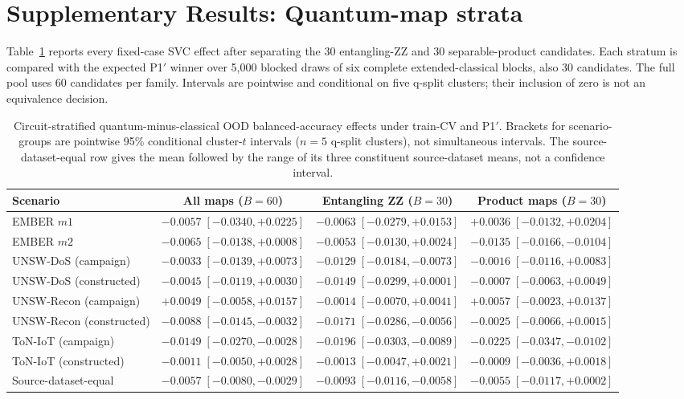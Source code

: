 \documentclass[11pt]{article}
\begin{document}
\clearpage
\section*{Supplementary Results: Quantum-map strata}
\label{supp:quantum_strata}

Table~\ref{supp:tab_quantum_strata} reports every fixed-case SVC effect after
separating the 30 entangling-ZZ and 30 separable-product candidates. Each
stratum is compared with the expected P1$'$ winner over 5,000 blocked draws
of six complete extended-classical blocks, also 30 candidates. The full pool
uses 60 candidates per family. Intervals are pointwise and conditional on five
q-split clusters; their inclusion of zero is not an equivalence decision.

\begin{table}[ht]
\centering
\caption{Circuit-stratified quantum-minus-classical OOD balanced-accuracy
effects under train-CV and P1$'$. Brackets for scenario-groups are pointwise
95\% conditional cluster-$t$ intervals ($n=5$ q-split clusters), not
simultaneous intervals. The source-dataset-equal row gives the mean followed
by the range of its three constituent source-dataset means, not a confidence
interval.}
\label{supp:tab_quantum_strata}
\scriptsize
\setlength{\tabcolsep}{3pt}
\begin{tabular}{lccc}
\toprule
Scenario & All maps ($B=60$) & Entangling ZZ ($B=30$) & Product maps ($B=30$) \\
\midrule
EMBER $m1$ & $-0.0057\;[-0.0340,+0.0225]$ & $-0.0063\;[-0.0279,+0.0153]$ & $+0.0036\;[-0.0132,+0.0204]$ \\
EMBER $m2$ & $-0.0065\;[-0.0138,+0.0008]$ & $-0.0053\;[-0.0130,+0.0024]$ & $-0.0135\;[-0.0166,-0.0104]$ \\
UNSW-DoS (campaign) & $-0.0033\;[-0.0139,+0.0073]$ & $-0.0129\;[-0.0184,-0.0073]$ & $-0.0016\;[-0.0116,+0.0083]$ \\
UNSW-DoS (constructed) & $-0.0045\;[-0.0119,+0.0030]$ & $-0.0149\;[-0.0299,+0.0001]$ & $-0.0007\;[-0.0063,+0.0049]$ \\
UNSW-Recon (campaign) & $+0.0049\;[-0.0058,+0.0157]$ & $-0.0014\;[-0.0070,+0.0041]$ & $+0.0057\;[-0.0023,+0.0137]$ \\
UNSW-Recon (constructed) & $-0.0088\;[-0.0145,-0.0032]$ & $-0.0171\;[-0.0286,-0.0056]$ & $-0.0025\;[-0.0066,+0.0015]$ \\
ToN-IoT (campaign) & $-0.0149\;[-0.0270,-0.0028]$ & $-0.0196\;[-0.0303,-0.0089]$ & $-0.0225\;[-0.0347,-0.0102]$ \\
ToN-IoT (constructed) & $-0.0011\;[-0.0050,+0.0028]$ & $-0.0013\;[-0.0047,+0.0021]$ & $-0.0009\;[-0.0036,+0.0018]$ \\
\midrule
Source-dataset-equal & $-0.0057\;[-0.0080,-0.0029]$ & $-0.0093\;[-0.0116,-0.0058]$ & $-0.0055\;[-0.0117,+0.0002]$ \\
\bottomrule
\end{tabular}
\end{table}
\end{document}
